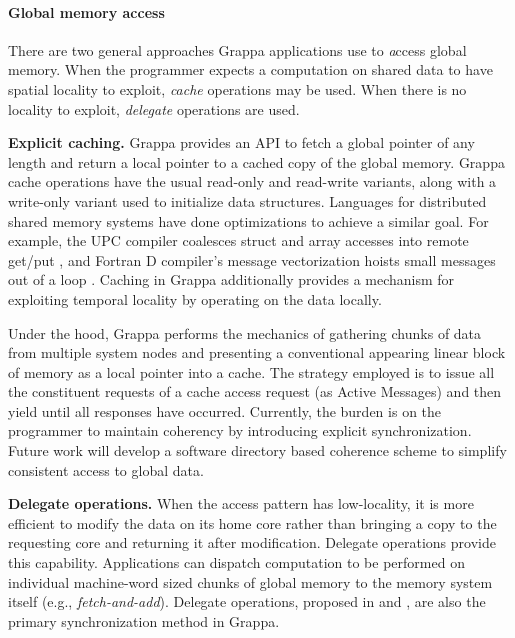 \paragraph{Global memory access} There are two general approaches Grappa applications use to {\emph access} global memory. When the programmer expects a computation on shared data to have spatial locality to exploit, {\em cache} operations may be used. When there is no locality to exploit, {\em delegate} operations are used.

\textbf{Explicit caching.} Grappa provides an API to fetch a global pointer of any length and return a local pointer to a cached copy of the global memory.  Grappa cache operations have the usual read-only and read-write variants, along with a write-only variant used to initialize data structures. Languages for distributed shared memory systems have done optimizations to achieve a similar goal. For example, the UPC compiler coalesces struct and array accesses into remote get/put \cite{Chen:2005}, and Fortran D compiler's message vectorization hoists small messages out of a loop \cite{FortranD:1992}. Caching in Grappa additionally provides a mechanism for exploiting temporal locality by operating on the data locally.

Under the hood, Grappa performs the mechanics of gathering chunks of data from multiple system nodes and presenting a conventional appearing linear block of memory as a local pointer into a cache. The strategy employed is to issue all the constituent requests of a cache access request  (as Active Messages) and then yield until all responses have occurred.  Currently, the burden is on the programmer to maintain coherency by introducing explicit synchronization.  Future work will develop a software directory based coherence scheme to simplify consistent access to global data.

\textbf{Delegate operations.} When the access pattern has low-locality, it is more efficient to modify the data on its home core rather than bringing a copy to the requesting core and returning it after modification. Delegate operations provide this capability. Applications can dispatch computation to be performed on individual machine-word sized chunks of global memory to the memory system itself (e.g., \emph{fetch-and-add}).  Delegate operations, proposed in \cite{Nelson:hotpar11} and \cite{delegated:oopsla11}, are also the primary synchronization method in Grappa.

